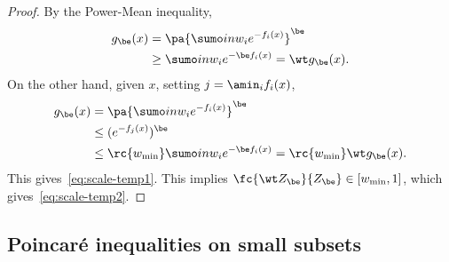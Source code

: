 \begin{proof}
By the Power-Mean inequality,
\begin{align}
g_\be(x) &= \pa{\sumo in w_i e^{-f_i(x)}}^\be\\
&\ge \sumo in w_i e^{-\be f_i(x)} = \wt g_\be(x).
\end{align}
On the other hand, given $x$, setting $j=\amin_i f_i(x)$, 
\begin{align}
g_\be(x) & = \pa{\sumo in w_i e^{-f_i(x)}}^\be\\
&\le (e^{-f_j(x)})^{\be}\\
&\le \rc{w_{\min}}\sumo in w_i e^{-\be f_i(x)} = \rc{w_{\min}} \wt g_\be(x).
\end{align}
This gives~\eqref{eq:scale-temp1}. This implies $\fc{\wt Z_\be}{Z_\be} \in [w_{\min},1]$, which gives~\eqref{eq:scale-temp2}.
\end{proof}

\subsection{Poincar\'e inequalities on small subsets}
\label{subsec:smallsetpoincare}
%

